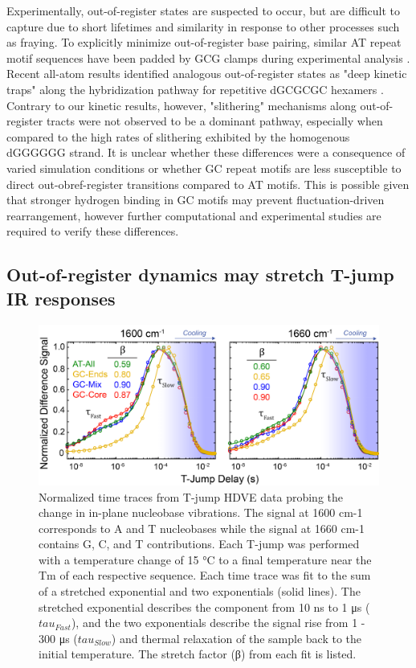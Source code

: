 \documentclass[journal=jpcbfk,manuscript=article]{achemso}
\begin{document}
Experimentally, out-of-register states are suspected to occur, but are difficult to capture due to short lifetimes and similarity in response to other processes such as fraying. To explicitly minimize out-of-register base pairing, similar AT repeat motif sequences have been padded by GCG clamps during experimental analysis \cite{Wyer2014KineticsAT-tracts}. Recent all-atom results identified analogous out-of-register states as "deep kinetic traps" along the hybridization pathway for repetitive dGCGCGC hexamers \citep{Xiao2019}. Contrary to our kinetic results, however, "slithering" mechanisms along out-of-register tracts were not observed to be a dominant pathway, especially when compared to the high rates of slithering exhibited by the homogenous dGGGGGG strand. It is unclear whether these differences were a consequence of varied simulation conditions or whether GC repeat motifs are less susceptible to direct out-obref-register transitions compared to AT motifs. This is possible given that stronger hydrogen binding in GC motifs \citep{Yakovchuk2006Base-stackingHelix,Zacharias2020Base-PairingFormation} may prevent fluctuation-driven rearrangement, however further computational and experimental studies are required to verify these differences.

\subsection{Out-of-register dynamics may stretch T-jump IR responses}


\begin{figure}[ht!] %
	\begin{center} 
        \includegraphics[width=150mm, scale=1]{Fig6.pdf}
        \caption{Normalized time traces from T-jump HDVE data probing the change in in-plane nucleobase vibrations. The signal at 1600 cm-1 corresponds to A and T nucleobases while the signal at 1660 cm-1 contains G, C, and T contributions. Each T-jump was performed with a temperature change of 15 °C to a final temperature near the Tm of each respective sequence. Each time trace was fit to the sum of a stretched exponential and two exponentials (solid lines). The stretched exponential describes the component from 10 ns to 1 μs ($tau_{Fast}$), and the two exponentials describe the signal rise from 1 - 300 μs ($tau_{Slow}$) and thermal relaxation of the sample back to the initial temperature. The stretch factor (β) from each fit is listed.}

        \label{fig:Fig6}
	\end{center}
\end{figure}
\end{document}
